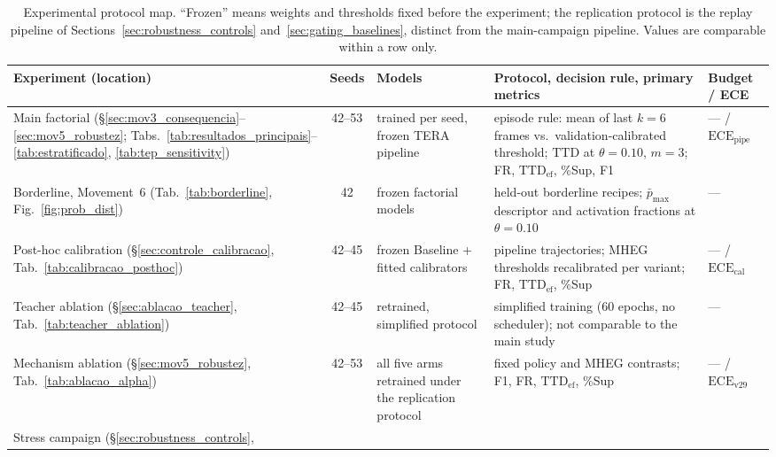 \documentclass[a4paper,fleqn]{cas-dc}
\newcommand{\MHEG}{\mbox{MHEG}\xspace}
\begin{document}
\begin{table}[!tbp]
\color{\revcolor}
\centering
\caption{Experimental protocol map. ``Frozen'' means weights and thresholds
fixed before the experiment; the replication protocol is the replay pipeline
of Sections~\ref{sec:robustness_controls} and~\ref{sec:gating_baselines},
distinct from the main-campaign pipeline. Values are comparable within a row
only.}
\label{tab:protocol_map}
\scriptsize
\setlength{\tabcolsep}{2.8pt}
\renewcommand{\arraystretch}{1.18}
\begin{tabularx}{\textwidth}{>{\raggedright\arraybackslash}p{2.7cm}
  c >{\raggedright\arraybackslash}p{3.0cm} >{\raggedright\arraybackslash}X
  >{\raggedright\arraybackslash}p{2.4cm}}
\toprule
\textbf{Experiment (location)} & \textbf{Seeds} & \textbf{Models}
  & \textbf{Protocol, decision rule, primary metrics}
  & \textbf{Budget / ECE} \\
\midrule
Main factorial (\S\ref{sec:mov3_consequencia}--\ref{sec:mov5_robustez};
Tabs.~\ref{tab:resultados_principais}--\ref{tab:estratificado},
\ref{tab:tep_sensitivity}) & 42--53 & trained per seed, frozen TERA pipeline
  & episode rule: mean of last $k{=}6$ frames vs.\ validation-calibrated
    threshold; $\mathrm{TTD}$ at $\theta{=}0.10$, $m{=}3$; FR,
    $\mathrm{TTD}_{\mathrm{ef}}$, \%Sup, F1
  & --- / $\mathrm{ECE}_{\mathrm{pipe}}$ \\
Borderline, Movement~6 (Tab.~\ref{tab:borderline},
Fig.~\ref{fig:prob_dist}) & 42 & frozen factorial models
  & held-out borderline recipes; $\bar{p}_{\max}$ descriptor and activation
    fractions at $\theta{=}0.10$ & --- \\
Post-hoc calibration (\S\ref{sec:controle_calibracao},
Tab.~\ref{tab:calibracao_posthoc}) & 42--45 & frozen Baseline + fitted
  calibrators & pipeline trajectories; \MHEG thresholds recalibrated per
  variant; FR, $\mathrm{TTD}_{\mathrm{ef}}$, \%Sup
  & --- / $\mathrm{ECE}_{\mathrm{cal}}$ \\
Teacher ablation (\S\ref{sec:ablacao_teacher},
Tab.~\ref{tab:teacher_ablation}) & 42--45 & retrained, simplified protocol
  & simplified training (60 epochs, no scheduler); not comparable to the main
    study & --- \\
Mechanism ablation (\S\ref{sec:mov5_robustez},
Tab.~\ref{tab:ablacao_alpha}) & 42--53 & all five arms retrained under the
  replication protocol & fixed policy and \MHEG contrasts; F1, FR,
  $\mathrm{TTD}_{\mathrm{ef}}$, \%Sup & --- / $\mathrm{ECE}_{\mathrm{v29}}$ \\
Stress campaign (\S\ref{sec:robustness_controls},

\end{tabularx}
\end{table}
\end{document}
